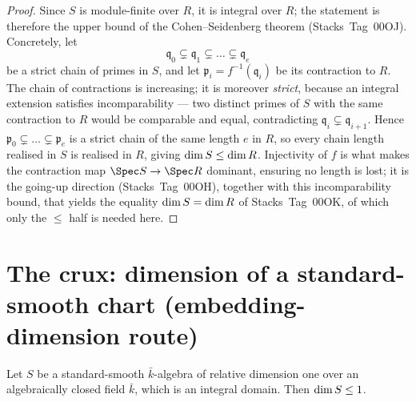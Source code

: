 \begin{proof}
\leanok
  Since \(S\) is module-finite over \(R\), it is integral over \(R\); the statement
  is therefore the upper bound of the Cohen--Seidenberg theorem (Stacks~Tag~00OJ).
  Concretely, let
  \[
    \mathfrak q_0 \subsetneq \mathfrak q_1 \subsetneq \dots \subsetneq \mathfrak q_e
  \]
  be a strict chain of primes in \(S\), and let \(\mathfrak p_i = f^{-1}(\mathfrak
  q_i)\) be its contraction to \(R\).  The chain of contractions is increasing; it is
  moreover \emph{strict}, because an integral extension satisfies incomparability ---
  two distinct primes of \(S\) with the same contraction to \(R\) would be comparable
  and equal, contradicting \(\mathfrak q_i \subsetneq \mathfrak q_{i+1}\).  Hence
  \(\mathfrak p_0 \subsetneq \dots \subsetneq \mathfrak p_e\) is a strict chain of the
  same length \(e\) in \(R\), so every chain length realised in \(S\) is realised in
  \(R\), giving \(\dim S \le \dim R\).  Injectivity of \(f\) is what makes
  the contraction map \(\Spec S \to \Spec R\) dominant, ensuring no length is lost; it
  is the going-up direction (Stacks~Tag~00OH), together with this incomparability
  bound, that yields the equality \(\dim S = \dim R\) of Stacks~Tag~00OK,
  of which only the \(\le\) half is needed here.
\end{proof}

\section{The crux: dimension of a standard-smooth chart (embedding-dimension route)}

\begin{lemma}
  \label{lem:chart_ringKrullDim_le_one}
  Let \(S\) be a standard-smooth \(\bar k\)-algebra of relative dimension one over an
  algebraically closed field \(\bar k\), which is an integral domain.  Then
  \(\dim S \le 1\).
\end{lemma}

